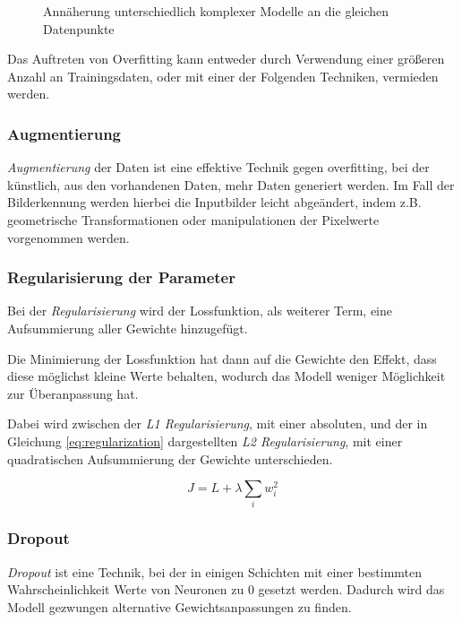 \vspace{1cm}
\begin{figure}[H]
    \centering
    \def\svgwidth{\textwidth}
    
    \caption{Annäherung unterschiedlich komplexer Modelle an die gleichen 
        Datenpunkte}
    \label{fig:over_under_fit}
\end{figure}
\vspace{1cm}

Das Auftreten von Overfitting kann entweder durch 
Verwendung einer größeren Anzahl an Trainingsdaten, 
oder mit einer der Folgenden Techniken, vermieden werden.


\subsubsection{Augmentierung}

\textit{Augmentierung} der Daten ist eine effektive Technik 
gegen \Gls{overfitting}, bei der künstlich,
aus den vorhandenen Daten, mehr Daten generiert werden. 
Im Fall der Bilderkennung werden hierbei 
die Inputbilder leicht abgeändert, indem z.B. geometrische 
Transformationen oder manipulationen der Pixelwerte 
vorgenommen werden.


\subsubsection{Regularisierung der Parameter}

Bei der \textit{Regularisierung} wird der Lossfunktion,
als weiterer Term, eine Aufsummierung aller Gewichte
hinzugefügt.

Die Minimierung der Lossfunktion hat dann auf 
die Gewichte den Effekt, dass diese möglichst 
kleine Werte behalten, wodurch das Modell weniger
Möglichkeit zur Überanpassung hat.

Dabei wird zwischen der \textit{L1 Regularisierung},
mit einer absoluten, und der in Gleichung \ref{eq:regularization}
dargestellten \textit{L2 Regularisierung}, mit einer 
quadratischen Aufsummierung der
Gewichte unterschieden.

\begin{equation}
    \label{eq:regularization}
    J = L + \lambda \sum_{i} w_{i}^{2}
\end{equation}


\subsubsection{Dropout}
\textit{Dropout} ist eine Technik, bei der in einigen Schichten 
mit einer bestimmten Wahrscheinlichkeit Werte von 
Neuronen zu 0 gesetzt werden.
Dadurch wird das Modell gezwungen alternative
Gewichtsanpassungen zu finden.

